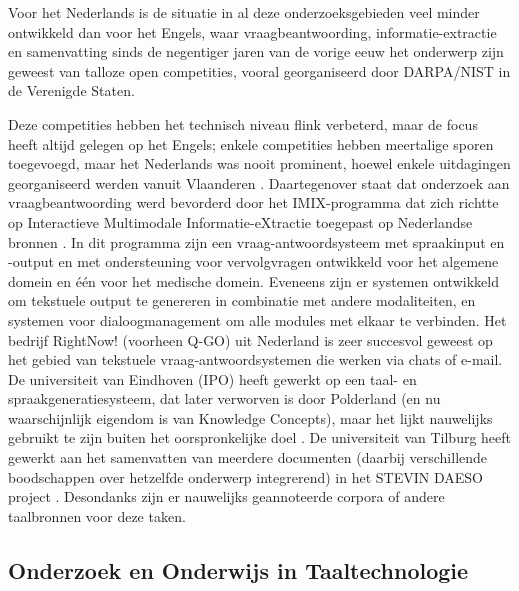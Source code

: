 \begin{multicols}{2}
    Voor het Nederlands is de situatie in al deze onderzoeksgebieden veel minder ontwikkeld dan voor het Engels, waar vraagbeantwoording, informatie-extractie en samenvatting sinds de negentiger jaren van de vorige eeuw het onderwerp zijn geweest van talloze open competities, vooral georganiseerd door DARPA/NIST in de Verenigde Staten.



Deze competities hebben het technisch niveau flink verbeterd, maar de focus heeft altijd gelegen op het Engels; enkele competities hebben meertalige sporen toegevoegd, maar het Nederlands was nooit prominent, hoewel enkele uitdagingen georganiseerd werden vanuit Vlaanderen \cite{SemEval}.  Daartegenover staat dat onderzoek aan vraagbeantwoording werd bevorderd door het IMIX-programma dat zich richtte op Interactieve Multimodale Informatie-eXtractie toegepast op Nederlandse bronnen \cite{IMIX}.  In dit programma zijn een vraag-antwoordsysteem met spraakinput en -output en met ondersteuning voor vervolgvragen ontwikkeld voor het algemene domein en {\'e}{\'e}n voor het medische domein. Eveneens zijn er systemen ontwikkeld om tekstuele output te genereren in combinatie met andere modaliteiten, en systemen voor dialoogmanagement om alle modules met elkaar te verbinden. Het bedrijf RightNow! (voorheen Q-GO) uit Nederland is zeer succesvol geweest op het gebied van tekstuele vraag-antwoordsystemen die werken via chats of e-mail. De universiteit van Eindhoven (IPO) heeft gewerkt op een taal- en spraakgeneratiesysteem, dat later verworven is door Polderland (en nu waarschijnlijk eigendom is van Knowledge Concepts), maar het lijkt nauwelijks gebruikt te zijn buiten het oorspronkelijke doel \cite{Theune:2003}.  De universiteit van Tilburg heeft gewerkt aan het samenvatten van meerdere documenten (daarbij verschillende boodschappen over hetzelfde onderwerp integrerend) in het STEVIN DAESO project \cite{DAESO}.  Desondanks zijn er nauwelijks geannoteerde corpora of andere taalbronnen voor deze taken.

\subsection{Onderzoek en Onderwijs in Taaltechnologie}


\end{multicols}
